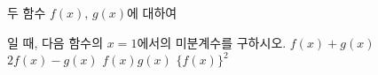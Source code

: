 두 함수 $f(x)$, $g(x)$에 대하여 \par\smallskip{}\par\smallskip\noindent 일 때, 다음 함수의 $x=1$에서의 미분계수를 구하시오.
 $f(x)+g(x)$
 $2f(x)-g(x)$
 $f(x)g(x)$
 $\{f(x)\}^2$
